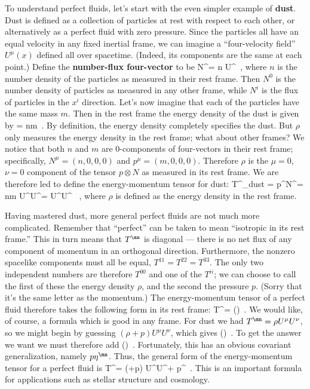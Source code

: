 To understand perfect fluids, let's start with the even simpler example 
of {\bf dust}.  Dust is defined as a collection of particles at rest
with respect to each other, or alternatively as a perfect fluid with
zero pressure.  Since the particles all have an equal velocity in
any fixed inertial frame, we can imagine a ``four-velocity field''
$U^\mu(x)$ defined all over spacetime.  (Indeed, its components are
the same at each point.)  Define the {\bf number-flux four-vector}
to be
\be
  N^\mu = n U^\mu\ ,\label{1.104}
\ee
where $n$ is the number density of the particles as measured in their
rest frame.  Then $N^0$ is the number density of particles as measured
in any other frame, while $N^i$ is the flux of particles in the $x^i$
direction.  Let's now imagine that each of the particles have the same
mass $m$.  Then in the rest frame the energy density of the dust is
given by
\be
  \rho = nm\ .\label{1.105}
\ee
By definition, the energy density completely specifies the dust.  But
$\rho$ only measures the energy density in the rest frame; what about
other frames?  We notice that both $n$ and $m$ are $0$-components of
four-vectors in their rest frame; specifically, $N^\mu = (n,0,0,0)$
and $p^\mu = (m,0,0,0)$.  Therefore $\rho$ is the $\mu = 0$, 
$\nu =0$ component of the tensor $p\otimes N$ as measured in its
rest frame.  We are therefore led to define the energy-momentum tensor
for dust:
\be
  T^\mn_{\rm dust} = p^\mu N^\nu = nm U^\mu U^\nu = \rho U^\mu U^\nu
  \ ,\label{1.106}
\ee
where $\rho$ is defined as the energy density in the rest frame.

Having mastered dust, more general perfect fluids are not much more
complicated.  Remember that ``perfect'' can be taken to mean
``isotropic in its rest frame.''  This in turn means that $T^\mn$
is diagonal --- there is no net flux of any component of momentum
in an orthogonal direction.  Furthermore, the nonzero spacelike 
components must all be equal, $T^{11} = T^{22}=T^{33}$.  The only
two independent numbers are therefore $T^{00}$ and one of the
$T^{ii}$; we can choose to call the first of these the energy density
$\rho$, and the second the pressure $p$.  (Sorry that it's the same
letter as the momentum.)  The energy-momentum tensor of a perfect
fluid therefore takes the following form in its rest frame:
\be
  T^\mn = \left(\right)\ .\label{1.107}
\ee
We would like, of course, a formula which is good in any frame.
For dust we had $T^\mn = \rho U^\mu U^\nu$, so we might begin by
guessing $(\rho+p)U^\mu U^\nu$, which gives
\be
  \left(\right)\ .\label{1.108}
\ee
To get the answer we want we must therefore add
\be
  \left(\right)\ .\label{1.109}
\ee
Fortunately, this has an obvious covariant generalization, namely
$p\eta^\mn$.  Thus, the general form of the energy-momentum 
tensor for a perfect fluid is
\be
  T^\mn = (\rho+p) U^\mu U^\nu + p\eta^\mn\ .\label{1.110}
\ee
This is an important formula for applications such as stellar
structure and cosmology.

